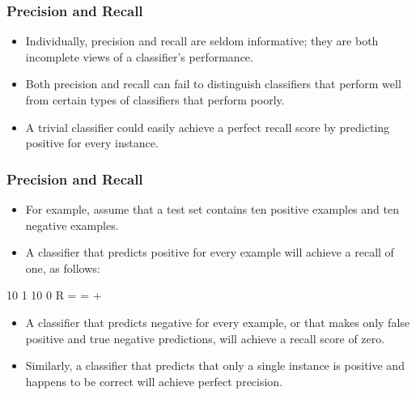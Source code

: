 \documentclass[PredictiveAnalytics101.tex]{subfiles}
\begin{document}
\begin{frame}
\frametitle{Precision and Recall}
\begin{itemize}
\item Individually, precision and recall are seldom informative; they are both incomplete
views of a classifier's performance. 
\item Both precision and recall can fail to distinguish
classifiers that perform well from certain types of classifiers that perform poorly.
\item A
trivial classifier could easily achieve a perfect recall score by predicting positive for
every instance.
\end{itemize}
 
\end{frame}
\begin{frame}
\frametitle{Precision and Recall}
\begin{itemize}
\item For example, assume that a test set contains ten positive examples
and ten negative examples.
\item A classifier that predicts positive for every example will
achieve a recall of one, as follows:
\end{itemize}

10 1
10 0
R = =
+
\end{frame}
\begin{frame}
	
	\begin{itemize}
\item A classifier that predicts negative for every example, or that makes only false positive
and true negative predictions, will achieve a recall score of zero. 
\item Similarly, a classifier
that predicts that only a single instance is positive and happens to be correct will
achieve perfect precision.
	\end{itemize}

\end{frame}
\end{document}
